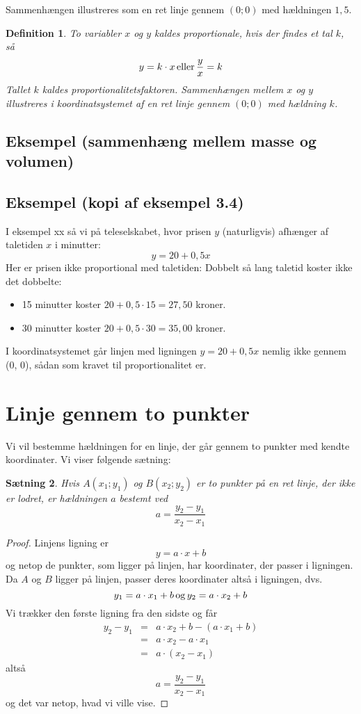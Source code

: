 \documentclass[12pt,oneside,a4paper]{article}
\newcommand{\bas}{\begin{eqnarray*}}
\newcommand{\eas}{\end{eqnarray*}}
\newtheorem{thm}{Sætning}[section]
\newtheorem{mydef}[thm]{Definition}
\begin{document}
Sammenhængen illustreres som en ret linje gennem $(0;0)$ med hældningen $1,5$.

\begin{mydef}
    To variabler $x$ og $y$ kaldes proportionale, hvis der findes et tal $k$, så
    $$
    y = k\cdot x \, {\rm eller} \, \frac{y}{x} = k
    $$
    Tallet $k$ kaldes proportionalitetsfaktoren. Sammenhængen mellem $x$ og $y$
    illustreres i koordinatsystemet af en ret linje gennem $(0; 0)$ med 
    hældning $k$.
\end{mydef}

\subsection{Eksempel (sammenhæng mellem masse og volumen)}

\subsection{Eksempel (kopi af eksempel 3.4)}
I eksempel xx så vi på teleselskabet, hvor prisen $y$ (naturligvis) afhænger af
taletiden $x$ i minutter:
$$
y=20+0,5x
$$
Her er prisen ikke proportional med taletiden: Dobbelt så lang taletid koster ikke
det dobbelte:
\begin{itemize}
    \item 15 minutter koster $20+0,5\cdot 15 = 27,50$ kroner.
    \item 30 minutter koster $20+0,5\cdot 30 = 35,00$ kroner.
\end{itemize}
I koordinatsystemet går linjen med ligningen $y=20+0,5x$ nemlig ikke gennem (0, 0),
sådan som kravet til proportionalitet er.

\section{Linje gennem to punkter}
Vi vil bestemme hældningen for en linje, der går gennem
to punkter med kendte koordinater. Vi viser følgende sætning:
\begin{thm}
    Hvis $A(x_1; y_1)$ og $B(x_2; y_2)$ er to punkter på en ret linje, der ikke
    er lodret, er hældningen $a$ bestemt ved
    $$
    a = \frac{y_2-y_1}{x_2-x_1}
    $$
\end{thm}
\begin{proof}
    Linjens ligning er 
    $$
    y = a\cdot x + b
    $$
    og netop de punkter, som ligger på linjen, har koordinater, der passer i
    ligningen.  Da $A$ og $B$ ligger på linjen, passer deres koordinater altså
    i ligningen, dvs.
    $$
    y_1 = a\cdot x_1 + b \, {\rm og} \, y_2 = a\cdot x_2 + b 
    $$
    Vi trækker den første ligning fra den sidste og får
    \bas
    y_2 - y_1 &=& a\cdot x_2 + b - (a\cdot x_1 + b) \\
              &=& a\cdot x_2 - a\cdot x_1 \\
              &=& a\cdot \left(x_2-x_1\right) 
    \eas
    altså
    $$
    a = \frac{y_2-y_1}{x_2-x_1}
    $$
    og det var netop, hvad vi ville vise.
\end{proof}
\end{document}

